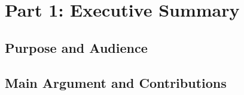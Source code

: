 
\section{Part 1: Executive Summary}
\label{sec:part1}

\subsection{Purpose and Audience}


\subsection{Main Argument and Contributions}

